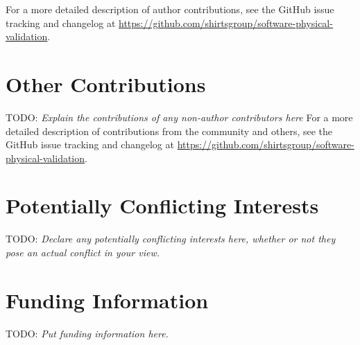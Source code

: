 \documentclass[9pt,bestpractices]{livecoms}
\newcommand{\githubrepository}{\url{https://github.com/shirtsgroup/software-physical-validation}}
\newcommand{\todo}[1]{{\color{blue}TODO: \emph{#1}}}
\begin{document}
For a more detailed description of author contributions,
see the GitHub issue tracking and changelog at \githubrepository.

\section{Other Contributions}
%

\todo{Explain the contributions of any non-author contributors here}
For a more detailed description of contributions from the community and others, see the GitHub issue tracking and changelog at \githubrepository.

\section{Potentially Conflicting Interests}

\todo{Declare any potentially conflicting interests here, whether or not they pose an actual conflict in your view.}

\section{Funding Information}

\todo{Put funding information here.}




\end{document}
